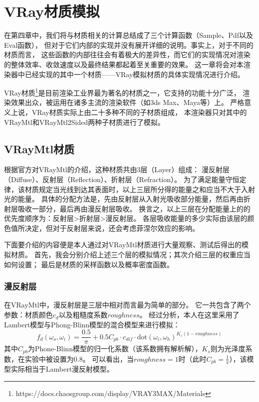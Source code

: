 \chapter{VRay材质模拟}
\label{cha:vray}

在第四章中，我们将与材质相关的计算总结成了三个计算函数（Sample、Pdf以及Eval函数），
但对于它们内部的实现并没有展开详细的说明。事实上，对于不同的材质而言，
这些函数的内部往往会有着极大的差异性，而它们的实现情况对渲染的整体效率、收敛速度以及最终结果都起着至关重要的效果。
这一章将会对本渲染器中已经实现的其中一个材质——VRay模拟材质的具体实现情况进行介绍。

VRay材质\footnote{https://docs.chaosgroup.com/display/VRAY3MAX/Materials}是目前渲染工业界最为著名的材质之一，它支持的功能十分广泛，
渲染效果出众，被运用在诸多主流的渲染软件（如3ds Max、Maya等）上。
严格意义上说，VRay材质实际上由二十多种不同的子材质组成，
本渲染器只对其中的VRayMtl和VRayMtl2Sided两种子材质进行了模拟。


\section{VRayMtl材质}

根据官方对VRayMtl的介绍，这种材质共由3层（Layer）组成：
漫反射层（Diffuse）、反射层（Reflection）、折射层（Refraction）。
为了满足能量守恒定律，该材质规定当光线到达其表面时，以上三层所分得的能量之和应当不大于入射光的能量。
具体的分配方法是，先由反射层从入射光吸收部分能量，然后再由折射层吸收一部分，最后再由漫反射层吸收。
换言之，以上三层在分配能量上的的优先度顺序为：反射层>折射层>漫反射层。
各层吸收能量的多少实际由该层的颜色值所决定，但对于反射层来说，还会考虑菲涅尔效应的影响。

下面要介绍的内容便是本人通过对VRayMtl材质进行大量观察、测试后得出的模拟材质。
首先，我会分别介绍上述三个层的模拟情况；其次介绍三层的权重应当如何设置；
最后是材质的采样函数以及概率密度函数。

\subsection{漫反射层}

在VRayMtl中，漫反射层是三层中相对而言最为简单的部分。
它一共包含了两个参数：材质颜色$c_{d}$以及粗糙度系数$roughness$。
经过分析，本人在这里采用了Lambert模型与Phong-Blinn模型的混合模型来进行模拟：
\begin{equation}
f_d(\omega_o, \omega_i) = \frac{0.5}{\pi} + 0.5C_{pb}\cdot c_{dif} \cdot \text{dot}(\omega_i, \omega_h)^{K_s(1-roughness)}
\end{equation}
其中$C_{pb}$为Phone-Blinn模型的归一化系数（该系数拥有解析解\cite{Phong}），$K_s$则为光泽度系数，在实验中被设置为0.8。
可以看出，当$roughness=1$时（此时$C_{pb}=\frac{1}{\pi}$），该模型实际相当于Lambert漫反射模型。

